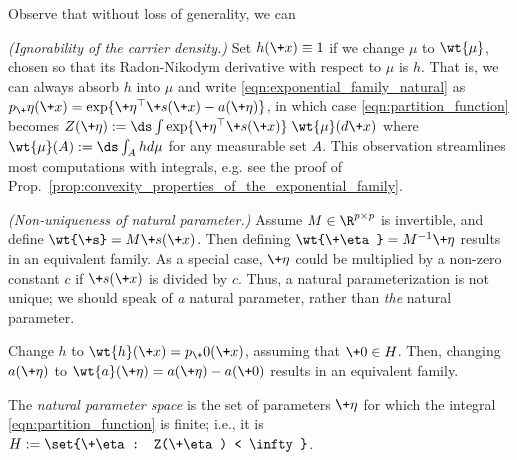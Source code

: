 \documentclass{article} %
\newcommand{\obs}{\+x}
\newcommand{\normalizerFunction}{Z}
\newcommand{\logNormalizerFunction}{a}
\newcommand{\sufficientStatsFunction}{\+s}
\newcommand{\carrierDensity}{h}
\newcommand{\naturalParam}{\+\eta}
\newcommand{\naturalParamSpace}{H}
\begin{document}
\begin{remark}
Observe \cite{chua2019stats} that without loss of generality, we can 
\begin{alphabate} 
\item \label{item:ignorabiity_of_carrier_density} \textit{(Ignorability of the carrier density.)} Set $\carrierDensity(\obs) \equiv 1$ if we change $\mu$ to $\wt{\mu}$, chosen so that its Radon-Nikodym derivative with respect to $\mu$ is $\carrierDensity$. That is, we can always absorb $\carrierDensity$ into $\mu$ and write \eqref{eqn:exponential_family_natural} as  $p_\naturalParam(\obs) = \exp \{ \naturalParam^\top \sufficientStatsFunction(\obs) - \logNormalizerFunction(\naturalParam)\}$, in which case \eqref{eqn:partition_function} becomes $\normalizerFunction(\naturalParam) := \ds\int  \exp \{ \naturalParam^\top \sufficientStatsFunction(\obs)  \} \; \wt{\mu} (d\obs) $ where $\wt{\mu}(A) := \ds\int_A \carrierDensity d\mu$ for any measurable set $A$.   This observation streamlines most computations with integrals, e.g. see the proof of Prop.~\ref{prop:convexity_properties_of_the_exponential_family}. 
\item \label{item:nonuniqueness_of_natural_parameter} \textit{(Non-uniqueness of natural parameter.)} Assume $M \in \R^{p \times p}$ is invertible, and define $\wt{\sufficientStatsFunction} = M \sufficientStatsFunction(\obs)$. Then defining $\wt{\naturalParam} = M^{-1} \naturalParam$ results in an equivalent family.  As a special case, $\naturalParam$ could be multiplied by a non-zero constant $c$ if $\sufficientStatsFunction(\obs)$ is divided by $c$.  Thus, a natural parameterization is not unique; we should speak of \textit{a} natural parameter,  rather than \textit{the} natural parameter.
\item Change $\carrierDensity$ to $\wt{\carrierDensity}(\obs) = p_\+0(\obs)$, assuming that $\+0 \in \naturalParamSpace$.  Then, changing $\logNormalizerFunction(\naturalParam)$ to $\wt{\logNormalizerFunction}(\naturalParam) = \logNormalizerFunction(\naturalParam) - \logNormalizerFunction(\+0)$ results in an equivalent family. 
\end{alphabate}
\label{rk:alternate_constructions_for_the_exponential_family}
\end{remark}


\begin{definition}
The \textit{natural parameter space} is the set of parameters $\naturalParam$ for which the integral \eqref{eqn:partition_function} is finite; i.e., it is $\naturalParamSpace:=\set{\naturalParam : \normalizerFunction(\naturalParam) < \infty}$.
\end{definition}
\end{document}
